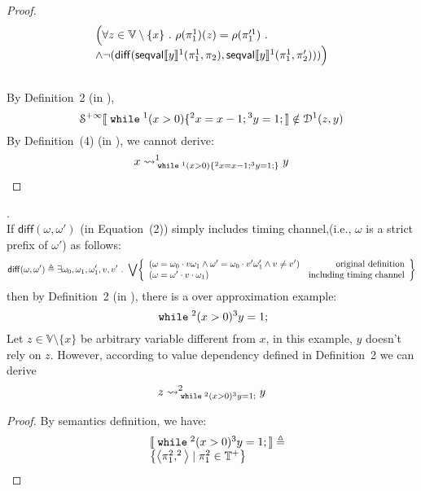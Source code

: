 \begin{example}
\begin{proof}
\[\begin{array}{l}
 	\Big(
 	\forall z \in \mathbb{V}\setminus \{x\} ~.~ \rho(\pi_1^1)(z) = \rho(\pi_1'^1) ~.~ \\
 	\land \neg(\mathsf{diff}(\mathsf{seqval}\llbracket y \rrbracket{}^1(\pi_1^1, \pi_2 ), \mathsf{seqval}\llbracket y \rrbracket{}^1(\pi_1^1, \pi_2' )))\Big)
 \end{array}
 \] 
 \\
 By Definition~2 (in \cite{cousot2019abstract}), 
 \[
 	\mathcal{S}^{+\infty}\llbracket \;\mathtt{while}\; {}^1 (x > 0) \{{}^2 x = x - 1; {}^3 y = 1; \rrbracket 
 \notin \mathcal{D}^1(z, y)
 \]
 By Definition~(4) (in \cite{cousot2019abstract}), we cannot derive:
 \[
 	x \rightsquigarrow^{1}_{\;\mathtt{while}\; {}^1 (x > 0) \{{}^2 x = x - 1; {}^3 y = 1;\}} y
 \]
 \end{proof}
 \end{example}
 \clearpage
 \begin{example}.
 \label{ex:overapp}
 \\
 If $\mathsf{diff}(\omega, \omega')$ (in \cite{cousot2019abstract} Equation~(2)) simply includes timing channel,(i.e., $\omega$ is a strict prefix of $\omega'$) as follows:
 \[
 	\mathsf{diff}(\omega, \omega') \triangleq \exists \omega_0, \omega_1, \omega_1', v, v' 
 	\st \bigvee \left\{
 	\begin{array}{lr}
 	(\omega = \omega_0 \cdot v \omega_1
 		\land \omega' = \omega_0 \cdot v' \omega_1' \land v \neq v') & \mbox{original definition} \\
 	(\omega = \omega' \cdot v \cdot \omega_1) & \mbox{including timing channel} \\
 	\end{array}
 	\right\}
 \] 
 then by Definition~2 (in \cite{cousot2019abstract}), there is a over approximation example:
 \[
 	\;\mathtt{while}\; {}^2 (x > 0) {}^3 y = 1; 
 \]
 Let $z \in \mathbb{V}\setminus \{x\}$ be arbitrary variable different from $x$,
 in this example, $y$ doesn't rely on $z$. 
 However, according to value dependency defined in Definition~2 \cite{cousot2019abstract} we can derive 
 \[
 	z \rightsquigarrow^{2}_{\;\mathtt{while}\; {}^2 (x > 0) {}^3 y = 1;} y
 \]
 \begin{proof}
 By semantics definition, we have:
 \begin{equation}
 \label{eq:sem_timingoverapp}
 \begin{array}{ll}
 & \sem{ \ewhile {}^2 (x > 0) {}^3 y = 1; } \triangleq \\
 & \left\{ \left< \pi_1^2, ^2\right> \mid \pi_1^2 \in \mathbb{T^{+}} \right\}
 \\

\end{array}
\end{equation}
\end{proof}
\end{example}
